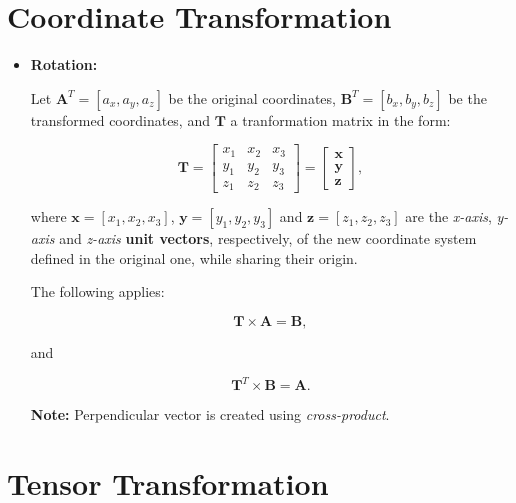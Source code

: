 \section{Coordinate Transformation}

\begin{itemize}
    \item \textbf{Rotation:}

        Let $\mathbf{A}^{T} = [a_{x}, a_{y}, a_{z}]$ be the original coordinates,
        $\mathbf{B}^{T} = [b_{x}, b_{y}, b_{z}]$ be the transformed coordinates, and
        $\mathbf{T}$ a tranformation matrix in the form:

        \begin{equation}
            \mathbf{T} = \begin{bmatrix}
                x_1 & x_2 & x_3 \\
                y_1 & y_2 & y_3 \\
                z_1 & z_2 & z_3
            \end{bmatrix} = \begin{bmatrix}
                \mathbf{x} \\
                \mathbf{y} \\
                \mathbf{z}
            \end{bmatrix}
        ,\end{equation}

        where $\mathbf{x} = [x_1, x_2, x_3]$, $\mathbf{y} = [y_1, y_2, y_3]$ and
        $\mathbf{z} = [z_1, z_2, z_3]$ are the \textit{x-axis}, \textit{y-axis} and
        \textit{z-axis} \textbf{unit vectors}, respectively, of the new coordinate
        system defined in the original one, while sharing their origin.

        The following applies:

        \begin{equation}
            \mathbf{T} \times \mathbf{A} = \mathbf{B}
        ,\end{equation}

        and

        \begin{equation}
            \mathbf{T}^{T} \times \mathbf{B} = \mathbf{A}
        .\end{equation}

        \textbf{Note:} Perpendicular vector is  created using \textit{cross-product}.
\end{itemize}


\section{Tensor Transformation}

